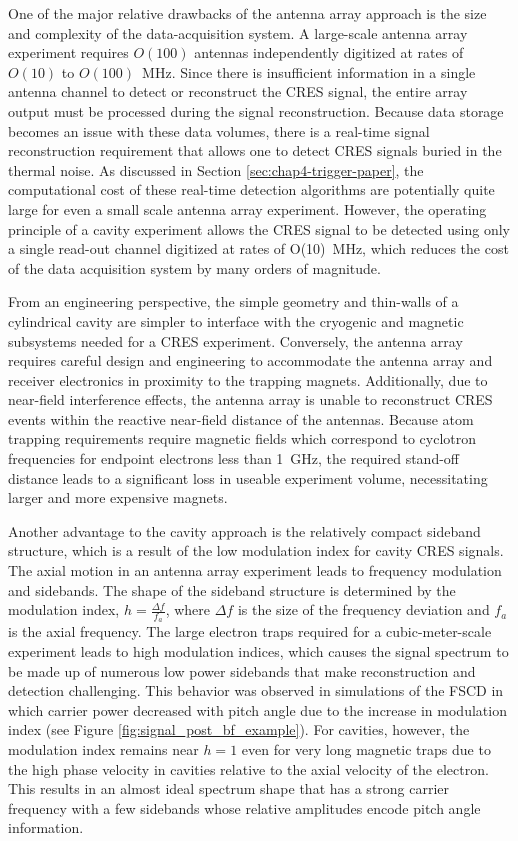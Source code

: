 One of the major relative drawbacks of the antenna array approach is the size and complexity of the data-acquisition system. A large-scale antenna array experiment requires $O(100)$ antennas independently digitized at rates of $O(10)$ to $O(100)$~MHz. Since there is insufficient information in a single antenna channel to detect or reconstruct the CRES signal, the entire array output must be processed during the signal reconstruction. Because data storage becomes an issue with these data volumes, there is a real-time signal reconstruction requirement that allows one to detect CRES signals buried in the thermal noise. As discussed in Section \ref{sec:chap4-trigger-paper}, the computational cost of these real-time detection algorithms are potentially quite large for even a small scale antenna array experiment. However, the operating principle of a cavity experiment allows the CRES signal to be detected using only a single read-out channel digitized at rates of O(10)~MHz, which reduces the cost of the data acquisition system by many orders of magnitude.

From an engineering perspective, the simple geometry and thin-walls of a cylindrical cavity are simpler to interface with the cryogenic and magnetic subsystems needed for a CRES experiment. Conversely, the antenna array requires careful design and engineering to accommodate the antenna array and receiver electronics in proximity to the trapping magnets. Additionally, due to near-field interference effects, the antenna array is unable to reconstruct CRES events within the reactive near-field distance of the antennas. Because atom trapping requirements require magnetic fields which correspond to cyclotron frequencies for endpoint electrons less than 1~GHz, the required stand-off distance leads to a significant loss in useable experiment volume, necessitating larger and more expensive magnets.

Another advantage to the cavity approach is the relatively compact sideband structure, which is a result of the low modulation index for cavity CRES signals. The axial motion in an antenna array experiment leads to frequency modulation and sidebands. The shape of the sideband structure is determined by the modulation index, $h=\frac{\Delta f}{f_a}$, where $\Delta f$ is the size of the frequency deviation and $f_a$ is the axial frequency. The large electron traps required for a cubic-meter-scale experiment leads to high modulation indices, which causes the signal spectrum to be made up of numerous low power sidebands that make reconstruction and detection challenging. This behavior was observed in simulations of the FSCD in which carrier power decreased with pitch angle due to the increase in modulation index (see Figure \ref{fig:signal_post_bf_example}). For cavities, however, the modulation index remains near $h=1$ even for very long magnetic traps due to the high phase velocity in cavities relative to the axial velocity of the electron. This results in an almost ideal spectrum shape that has a strong carrier frequency with a few sidebands whose relative amplitudes encode pitch angle information. 

